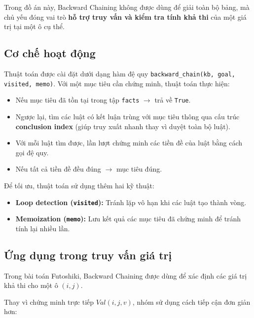 Trong đồ án này, Backward Chaining không được dùng để giải toàn bộ bảng, mà chủ yếu đóng vai trò \textbf{hỗ trợ truy vấn và kiểm tra tính khả thi} của một giá trị tại một ô cụ thể.

\subsection{Cơ chế hoạt động}

Thuật toán được cài đặt dưới dạng hàm đệ quy \texttt{backward\_chain(kb, goal, visited, memo)}. Với một mục tiêu cần chứng minh, thuật toán thực hiện:

\begin{itemize}
    \item Nếu mục tiêu đã tồn tại trong tập \texttt{facts} $\rightarrow$ trả về \texttt{True}.
    
    \item Ngược lại, tìm các luật có kết luận trùng với mục tiêu thông qua cấu trúc \textbf{conclusion index} (giúp truy xuất nhanh thay vì duyệt toàn bộ luật).
    
    \item Với mỗi luật tìm được, lần lượt chứng minh các tiền đề của luật bằng cách gọi đệ quy.
    
    \item Nếu tất cả tiền đề đều đúng $\rightarrow$ mục tiêu đúng.
\end{itemize}

Để tối ưu, thuật toán sử dụng thêm hai kỹ thuật:

\begin{itemize}
    \item \textbf{Loop detection (\texttt{visited}):} Tránh lặp vô hạn khi các luật tạo thành vòng.
    
    \item \textbf{Memoization (\texttt{memo}):} Lưu kết quả các mục tiêu đã chứng minh để tránh tính lại nhiều lần.
\end{itemize}

\subsection{Ứng dụng trong truy vấn giá trị}

Trong bài toán Futoshiki, Backward Chaining được dùng để xác định các giá trị khả thi cho một ô $(i,j)$.

Thay vì chứng minh trực tiếp $Val(i,j,v)$, nhóm sử dụng cách tiếp cận đơn giản hơn:


